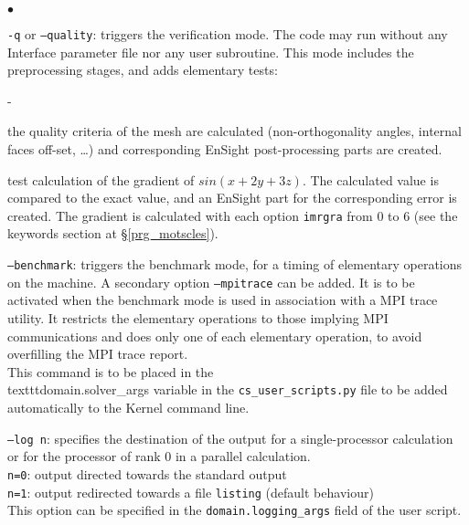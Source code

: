{{{\begin{list}{$\bullet$}{}
\item \texttt{-q} or \texttt{--quality}: triggers the verification mode.
The code may run without any Interface parameter file nor any user subroutine.
This mode includes the preprocessing stages, and adds elementary tests:\\
\begin{list}{-}{}
\item the quality criteria of the mesh are calculated (non-orthogonality angles,
internal faces off-set, \ldots) and corresponding EnSight
post-processing parts are created.\\
\item test calculation of the gradient of $sin(x+2y+3z)$. The calculated
value is compared to the exact value, and an EnSight part for the
corresponding error is created. The gradient is calculated with each
option \texttt{imrgra} from $0$ to $6$ (see the keywords section at \S\ref{prg_motscles}).\\
\end{list}

\item \texttt{--benchmark}: triggers the benchmark mode, for a timing
of elementary operations on the machine. A secondary option
\texttt{--mpitrace} can be added. It is to be activated when the benchmark mode
is used in association with a MPI trace utility. It restricts the elementary
operations to those implying MPI communications and does only one of each
elementary operation, to avoid overfilling the MPI trace report.\\
This command is to be placed in the \\texttt{domain.solver\_args} variable
in the \texttt{cs\_user\_scripts.py} file to be added automatically to the 
Kernel command line.

\item \texttt{--log n}: specifies the destination of the output for a
single-processor calculation or for the processor of rank 0 in a parallel
calculation.\\
\hspace*{0.5cm}\texttt{n=0}: output directed towards the standard output\\
\hspace*{0.5cm}\texttt{n=1}: output redirected towards a file \texttt{listing}
(default behaviour)\\
This option can be specified in the \texttt{domain.logging\_args} field
of the user script.


\end{list}}}}
